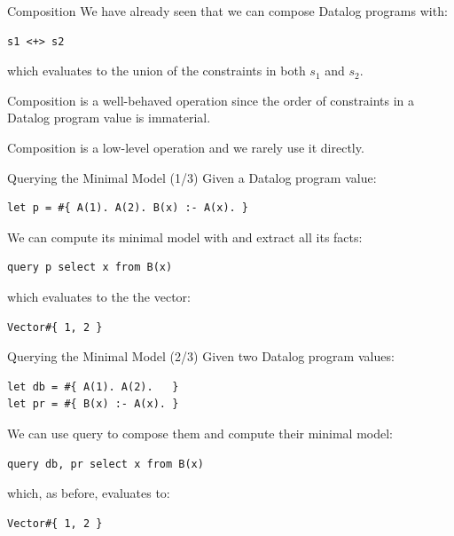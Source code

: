 \begin{frame}[fragile]{Composition}
We have already seen that we can compose Datalog programs with:

\begin{lstlisting}[language=flix, xleftmargin=0.8cm]
s1 <+> s2
\end{lstlisting}

which evaluates to the union of the constraints in both $s_1$ and $s_2$.

Composition is a well-behaved operation since the order of constraints in a
Datalog program value is immaterial. 

Composition is a low-level operation and we rarely use it directly.
\end{frame}

\begin{frame}[fragile]{Querying the Minimal Model (1/3)}
Given a Datalog program value:

\begin{lstlisting}[language=flix, xleftmargin=0.8cm]
let p = #{ A(1). A(2). B(x) :- A(x). }
\end{lstlisting}

We can compute its minimal model with  and extract all its 
facts:

\begin{lstlisting}[language=flix, xleftmargin=0.8cm]
query p select x from B(x) 
\end{lstlisting}

which evaluates to the the vector:

\begin{lstlisting}[language=flix, xleftmargin=0.8cm]
Vector#{ 1, 2 }
\end{lstlisting}
\end{frame}

\begin{frame}[fragile]{Querying the Minimal Model (2/3)}
Given two Datalog program values:
    
\begin{lstlisting}[language=flix, xleftmargin=0.8cm]
let db = #{ A(1). A(2).   }
let pr = #{ B(x) :- A(x). }
\end{lstlisting}

We can use query to compose them and compute their minimal model:

\begin{lstlisting}[language=flix, xleftmargin=0.8cm]
query db, pr select x from B(x) 
\end{lstlisting}

which, as before, evaluates to:

\begin{lstlisting}[language=flix, xleftmargin=0.8cm]
Vector#{ 1, 2 }
\end{lstlisting}
\end{frame}

